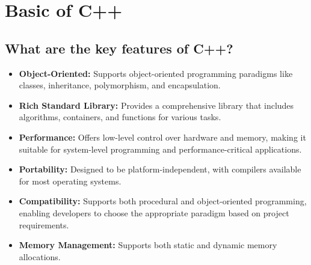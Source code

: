 \section{Basic of C++}

\subsection{What are the key features of C++?}
\begin{itemize}
    \item \textbf{Object-Oriented:} Supports object-oriented programming paradigms like classes, inheritance, polymorphism, and encapsulation.
    \item \textbf{Rich Standard Library:} Provides a comprehensive library that includes algorithms, containers, and functions for various tasks.
    \item \textbf{Performance:} Offers low-level control over hardware and memory, making it suitable for system-level programming and performance-critical applications.
    \item \textbf{Portability:} Designed to be platform-independent, with compilers available for most operating systems.
    \item \textbf{Compatibility:} Supports both procedural and object-oriented programming, enabling developers to choose the appropriate paradigm based on project requirements.
    \item \textbf{Memory Management:} Supports both static and dynamic memory allocations.
\end{itemize}

